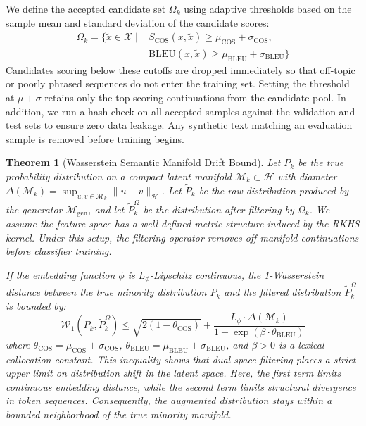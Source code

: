 \documentclass[10pt,journal,compsoc]{IEEEtran}
\newtheorem{theorem}{Theorem}
\begin{document}
We define the accepted candidate set $\Omega_k$ using adaptive thresholds based on the sample mean and standard deviation of the candidate scores:
\begin{align}
    \Omega_k = \Big\{ \tilde{x} \in \mathcal{X} \;\Big|\; & S_{\text{COS}}(x, \tilde{x}) \ge \mu_{\text{COS}} + \sigma_{\text{COS}}, \nonumber \\
    & \text{BLEU}(x, \tilde{x}) \ge \mu_{\text{BLEU}} + \sigma_{\text{BLEU}} \Big\}
\end{align}
Candidates scoring below these cutoffs are dropped immediately so that off-topic or poorly phrased sequences do not enter the training set. Setting the threshold at $\mu + \sigma$ retains only the top-scoring continuations from the candidate pool. In addition, we run a hash check on all accepted samples against the validation and test sets to ensure zero data leakage. Any synthetic text matching an evaluation sample is removed before training begins.

\begin{theorem}[Wasserstein Semantic Manifold Drift Bound]
\label{thm:wasserstein_bound}
Let $P_k$ be the true probability distribution on a compact latent manifold $\mathcal{M}_k \subset \mathcal{H}$ with diameter $\Delta(\mathcal{M}_k) = \sup_{u, v \in \mathcal{M}_k} \|u - v\|_\mathcal{H}$. Let $\tilde{P}_k$ be the raw distribution produced by the generator $\mathcal{M}_{\text{gen}}$, and let $\tilde{P}_k^{\Omega}$ be the distribution after filtering by $\Omega_k$. We assume the feature space has a well-defined metric structure induced by the RKHS kernel. Under this setup, the filtering operator removes off-manifold continuations before classifier training.

If the embedding function $\phi$ is $L_\phi$-Lipschitz continuous, the 1-Wasserstein distance between the true minority distribution $P_k$ and the filtered distribution $\tilde{P}_k^{\Omega}$ is bounded by:
\begin{equation}
    \mathcal{W}_1(P_k, \tilde{P}_k^{\Omega}) \le \sqrt{2\left(1 - \theta_{\text{COS}}\right)} + \frac{L_\phi \cdot \Delta(\mathcal{M}_k)}{1 + \exp\left(\beta \cdot \theta_{\text{BLEU}}\right)}
\end{equation}
where $\theta_{\text{COS}} = \mu_{\text{COS}} + \sigma_{\text{COS}}$, $\theta_{\text{BLEU}} = \mu_{\text{BLEU}} + \sigma_{\text{BLEU}}$, and $\beta > 0$ is a lexical collocation constant. This inequality shows that dual-space filtering places a strict upper limit on distribution shift in the latent space. Here, the first term limits continuous embedding distance, while the second term limits structural divergence in token sequences. Consequently, the augmented distribution stays within a bounded neighborhood of the true minority manifold.
\end{theorem}
\end{document}
